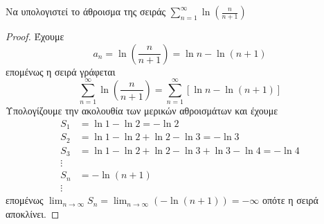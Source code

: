 \documentclass[main.tex]{subfiles}
\begin{document}
\begin{examples}
\begin{enumerate}
        \item Να υπολογιστεί το άθροισμα της σειράς $ \sum_{n=1}^{\infty} 
            \ln{\left(\frac{n}{n+1}\right)} $
            \begin{proof}
            \item {}
                Έχουμε
                \[
                    a_{n} = \ln{\left(\frac{n}{n+1}\right)} = \ln{n} - \ln{(n+1)}  
                \]
                επομένως η σειρά γράφεται
                \[
                    \sum_{n=1}^{\infty} \ln{\left(\frac{n}{n+1} \right)} = 
                    \sum_{n=1}^{\infty} [ \ln{n} - \ln{(n+1)} ]
                \] 
                Υπολογίζουμε την ακολουθία των μερικών αθροισμάτων και έχουμε
                \begin{align*}
                    S_{1} &= \ln{1} - \ln{2} = - \ln{2}  \\
                    S_{2} &= \ln{1} - \ln{2} + \ln{2} - \ln{3} = - \ln{3}  \\
                    S_{3} &= \ln{1} - \ln{2} + \ln{2} - \ln{3} + \ln{3} - \ln{4} = - 
                    \ln{4}\\
                    \vdots \\
                    S_{n} &= - \ln{(n+1)} \\
                    \vdots
                \end{align*}
                επομένως $ \lim_{n \to \infty} S_{n} = 
                \lim_{n \to \infty} (- \ln{(n+1)}) = - \infty $ οπότε η σειρά αποκλίνει.
            \end{proof}
    \end{enumerate}
\end{examples}




\end{document}
